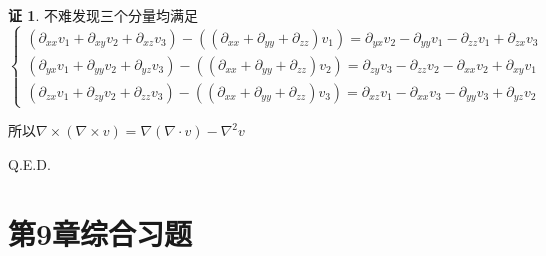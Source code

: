 \documentclass[a4paper,12pt]{article}
\theoremstyle{definition}
\newtheorem*{pf}{证}
\begin{document}
\begin{pf}
    不难发现三个分量均满足$$\begin{cases}
            (\partial_{xx}v_1 + \partial_{xy}v_2 + \partial_{xz}v_3)-((\partial_{xx}+\partial_{yy}+\partial_{zz})v_1)=\partial_{yx}v_2-\partial_{yy}v_1-\partial_{zz}v_1+\partial_{zx}v_3 \\
            (\partial_{yx}v_1 + \partial_{yy}v_2 + \partial_{yz}v_3)-((\partial_{xx}+\partial_{yy}+\partial_{zz})v_2)=\partial_{zy}v_3-\partial_{zz}v_2-\partial_{xx}v_2+\partial_{xy}v_1 \\
            (\partial_{zx}v_1 + \partial_{zy}v_2 + \partial_{zz}v_3)-((\partial_{xx}+\partial_{yy}+\partial_{zz})v_3)=\partial_{xz}v_1-\partial_{xx}v_3-\partial_{yy}v_3+\partial_{yz}v_2
        \end{cases}$$

    所以$\nabla\times(\nabla\times v)=\nabla(\nabla\cdot v)-\nabla^2v$

    Q.E.D.
\end{pf}

\section*{第9章综合习题}
\end{document}

